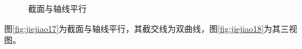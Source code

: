\begin{figure}[htbp]
\centering
{}\hspace{60pt}
\caption{截面与轴线平行}
\end{figure}
图\ref{fig:jiejiao17}为截面与轴线平行，其截交线为双曲线，图\ref{fig:jiejiao18}为其三视图。
\endinput
 